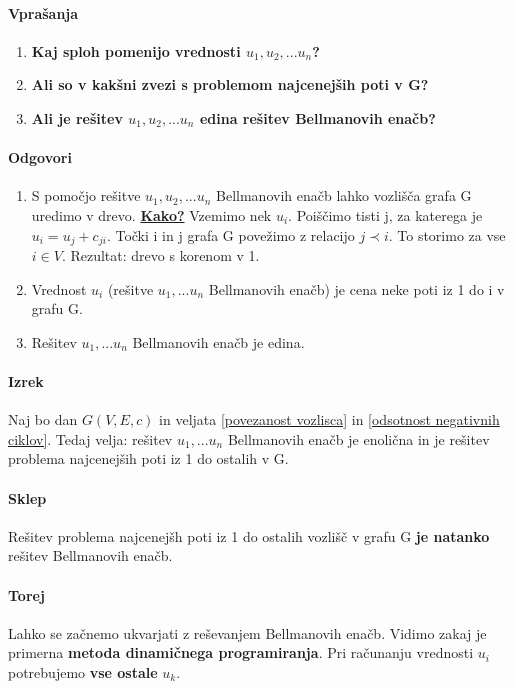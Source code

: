 \documentclass[a4paper,10pt]{article}
\begin{document}
\paragraph{Vpra\v sanja}
\begin{enumerate}
\item \textbf{Kaj sploh pomenijo vrednosti $u_1, u_2,... u_n$?}
\item \textbf{Ali so v kak\v sni zvezi s problemom najcenej\v sih poti v G?}
\item \textbf{Ali je re\v sitev $u_1, u_2,... u_n$ edina re\v sitev Bellmanovih ena\v cb?}
\end{enumerate}

\paragraph{Odgovori}
\begin{enumerate}
\item S pomo\v cjo re\v sitve $u_1, u_2,... u_n$ Bellmanovih ena\v cb lahko vozli\v s\v ca grafa G uredimo v drevo.
	\textbf{\underline{Kako?}}
	Vzemimo nek $u_i$. Poi\v s\v cimo tisti j, za katerega je $u_i = u_j + c_{ji}$. To\v cki i in j grafa G pove\v zimo z relacijo $j \prec i$. To storimo za vse $i \in V$. Rezultat: drevo s korenom v 1.
\item Vrednost $u_i$ (re\v sitve $u_1,...u_n$ Bellmanovih ena\v cb) je cena neke poti iz 1 do i v grafu G.
\item Re\v sitev $u_1,...u_n$ Bellmanovih ena\v cb je edina.
\end{enumerate}

\paragraph{Izrek}
Naj bo dan $G(V,E,c)$ in veljata \ref{povezanost vozlisca} in \ref{odsotnost negativnih ciklov}. Tedaj velja: re\v sitev $u_1,... u_n$ Bellmanovih ena\v cb je enoli\v cna in je re\v sitev problema najcenej\v sih poti iz 1 do ostalih v G.

\paragraph{Sklep}
Re\v sitev problema najcenej\v sh poti iz 1 do ostalih vozli\v s\v c v grafu G \textbf{je natanko} re\v sitev Bellmanovih ena\v cb.

\paragraph{Torej}
Lahko se za\v cnemo ukvarjati z re\v sevanjem Bellmanovih ena\v cb. Vidimo zakaj je primerna \textbf{metoda dinami\v cnega programiranja}. Pri ra\v cunanju vrednosti $u_i$ potrebujemo \textbf{vse ostale} $u_k$.
\end{document}
